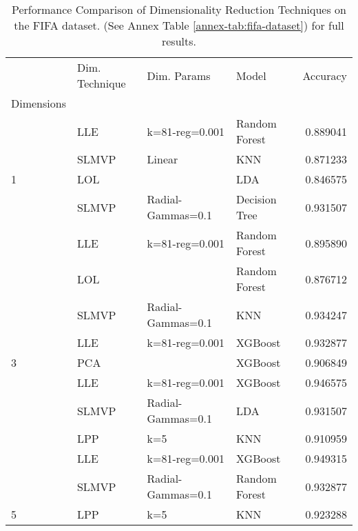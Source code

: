 \begin{table}[!ht]
    \begin{tabular}{llllr}
        \toprule
        {}                                      & Dim. Technique & Dim. Params       & Model         & Accuracy \\
        Dimensions                              &                &                   &               &          \\
        \midrule
                                                & LLE            & k=81-reg=0.001    & Random Forest & 0.889041 \\
                                                & SLMVP          & Linear            & KNN           & 0.871233 \\
        \multirow{-3}{*}{1}                     & LOL            &                   & LDA           & 0.846575 \\
        \rowcolor{lightgray}                    & SLMVP          & Radial-Gammas=0.1 & Decision Tree & 0.931507 \\
        \rowcolor{lightgray}                    & LLE            & k=81-reg=0.001    & Random Forest & 0.895890 \\
        \rowcolor{lightgray}\multirow{-3}{*}{2} & LOL            &                   & Random Forest & 0.876712 \\
                                                & SLMVP          & Radial-Gammas=0.1 & KNN           & 0.934247 \\
                                                & LLE            & k=81-reg=0.001    & XGBoost       & 0.932877 \\
        \multirow{-3}{*}{3}                     & PCA            &                   & XGBoost       & 0.906849 \\
        \rowcolor{lightgray}                    & LLE            & k=81-reg=0.001    & XGBoost       & 0.946575 \\
        \rowcolor{lightgray}                    & SLMVP          & Radial-Gammas=0.1 & LDA           & 0.931507 \\
        \rowcolor{lightgray}\multirow{-3}{*}{4} & LPP            & k=5               & KNN           & 0.910959 \\
                                                & LLE            & k=81-reg=0.001    & XGBoost       & 0.949315 \\
                                                & SLMVP          & Radial-Gammas=0.1 & Random Forest & 0.932877 \\
        \multirow{-3}{*}{5}                     & LPP            & k=5               & KNN           & 0.923288 \\
        \bottomrule
    \end{tabular}
    \caption{Performance Comparison of Dimensionality Reduction Techniques on the FIFA dataset. (See Annex Table \ref{annex-tab:fifa-dataset}) for full results.}
    \label{tab:fifa-dataset}
\end{table}

